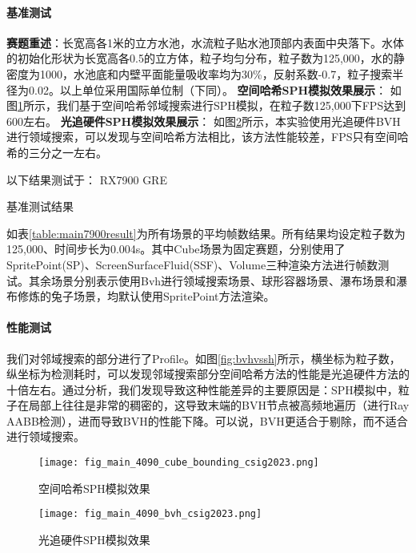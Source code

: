 \paragraph{基准测试}

\textbf{赛题重述}：长宽高各1米的立方水池，水流粒子贴水池顶部内表面中央落下。水体的初始化形状为长宽高各0.5的立方体，粒子均匀分布，粒子数为125,000，水的静密度为1000，水池底和内壁平面能量吸收率均为30\%，反射系数-0.7，粒子搜索半径为0.02。以上单位采用国际单位制（下同）。
\textbf{空间哈希SPH模拟效果展示}：
如图\ref{fig:main4090cubebounding}所示，我们基于空间哈希邻域搜索进行SPH模拟，在粒子数125,000下FPS达到600左右。
\textbf{光追硬件SPH模拟效果展示}：
如图\ref{fig:bvh}所示，本实验使用光追硬件BVH进行领域搜索，可以发现与空间哈希方法相比，该方法性能较差，FPS只有空间哈希的三分之一左右。

以下结果测试于： RX7900 GRE
\begin{table}[h!]
    \begin{center}
        
    \end{center}
    \caption{基准测试结果}
    \label{table:main7900result}
\end{table}

如表\ref{table:main7900result}为所有场景的平均帧数结果。所有结果均设定粒子数为125,000、时间步长为0.004s。其中Cube场景为固定赛题，分别使用了SpritePoint(SP)、ScreenSurfaceFluid(SSF)、Volume三种渲染方法进行帧数测试。其余场景分别表示使用Bvh进行领域搜索场景、球形容器场景、瀑布场景和瀑布修炼的兔子场景，均默认使用SpritePoint方法渲染。

\paragraph{性能测试}

我们对邻域搜索的部分进行了Profile。如图\ref{fig:bvhvssh}所示，横坐标为粒子数，纵坐标为检测耗时，可以发现邻域搜索部分空间哈希方法的性能是光追硬件方法的十倍左右。通过分析，我们发现导致这种性能差异的主要原因是：SPH模拟中，粒子在局部上往往是非常的稠密的，这导致末端的BVH节点被高频地遍历（进行Ray AABB检测），进而导致BVH的性能下降。可以说，BVH更适合于剔除，而不适合进行领域搜索。
\begin{figure}[H]
	\centering
	\texttt{[image: fig\_main\_4090\_cube\_bounding\_csig2023.png]}
	\caption{空间哈希SPH模拟效果}
	\label{fig:main4090cubebounding}
\end{figure}

\begin{figure}[H]
	\centering
	\texttt{[image: fig\_main\_4090\_bvh\_csig2023.png]}
	\caption{光追硬件SPH模拟效果}
	\label{fig:bvh}
\end{figure}

